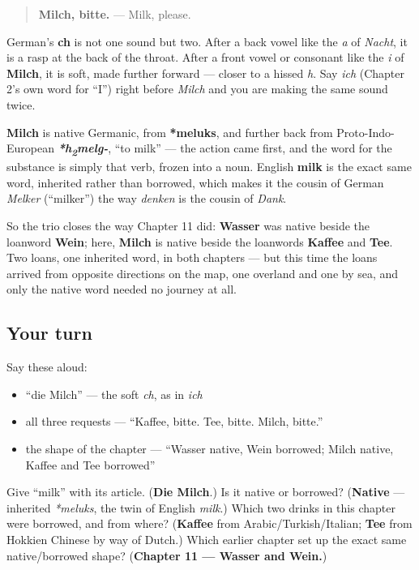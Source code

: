 \begin{quote}
\textbf{Milch, bitte.} — Milk, please.
\end{quote}

\begin{sounds}
German's \textbf{ch} is not one sound but two. After a back vowel like the \emph{a} of \emph{Nacht}, it is a rasp at the back of the throat. After a front vowel or consonant like the \emph{i} of \textbf{Milch}, it is soft, made further forward — closer to a hissed \emph{h}. Say \emph{ich} (Chapter 2's own word for \textquotedblleft{}I\textquotedblright{}) right before \emph{Milch} and you are making the same sound twice.
\end{sounds}

\begin{cousinweb}
\textbf{Milch} is native Germanic, from \textbf{*meluks}, and further back from Proto-Indo-European \emph{\textbf{*h\textsubscript{2}melg-}}, \textquotedblleft{}to milk\textquotedblright{} — the action came first, and the word for the substance is simply that verb, frozen into a noun. English \textbf{milk} is the exact same word, inherited rather than borrowed, which makes it the cousin of German \emph{Melker} (\textquotedblleft{}milker\textquotedblright{}) the way \emph{denken} is the cousin of \emph{Dank}.

So the trio closes the way Chapter 11 did: \textbf{Wasser} was native beside the loanword \textbf{Wein}; here, \textbf{Milch} is native beside the loanwords \textbf{Kaffee} and \textbf{Tee}. Two loans, one inherited word, in both chapters — but this time the loans arrived from opposite directions on the map, one overland and one by sea, and only the native word needed no journey at all.
\end{cousinweb}

\subsection*{Your turn}
Say these aloud:

\begin{itemize}
\raggedright
  \item \textquotedblleft{}die Milch\textquotedblright{} — the soft \emph{ch}, as in \emph{ich}
  \item all three requests — \textquotedblleft{}Kaffee, bitte. Tee, bitte. Milch, bitte.\textquotedblright{}
  \item the shape of the chapter — \textquotedblleft{}Wasser native, Wein borrowed; Milch native, Kaffee and Tee borrowed\textquotedblright{}
\end{itemize}

\begin{tcolorbox}[breakable,colback=teal!4,colframe=teal!35!black,title={Before you move on}]
Give \textquotedblleft{}milk\textquotedblright{} with its article. (\textbf{Die Milch}.) Is it native or borrowed? (\textbf{Native} — inherited \emph{*meluks}, the twin of English \emph{milk}.) Which two drinks in this chapter were borrowed, and from where? (\textbf{Kaffee} from Arabic/Turkish/Italian; \textbf{Tee} from Hokkien Chinese by way of Dutch.) Which earlier chapter set up the exact same native/borrowed shape? (\textbf{Chapter 11 — Wasser and Wein.})
\end{tcolorbox}
